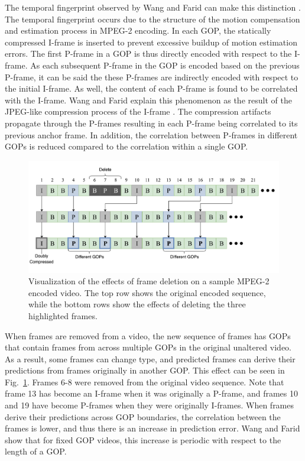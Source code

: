 The temporal fingerprint observed by Wang and Farid can make this distinction \cite{wang}. The temporal fingerprint occurs due to the structure of the motion compensation and estimation process in MPEG-2 encoding. In each GOP, the statically compressed I-frame is inserted to prevent excessive buildup of motion estimation errors. The first P-frame in a GOP is thus directly encoded with respect to the I-frame. As each subsequent P-frame in the GOP is encoded based on the previous P-frame, it can be said the these P-frames are indirectly encoded with respect to the initial I-frame. As well, the content of each P-frame is found to be correlated with the I-frame. Wang and Farid explain this phenomenon as the result of the JPEG-like compression process of the I-frame \cite{wang}. The compression artifacts propagate through the P-frames resulting in each P-frame being correlated to its previous anchor frame. In addition, the correlation between P-frames in different GOPs is reduced compared to the correlation within a single GOP.

\begin{figure}[htbp]
\centerline{\includegraphics[width=0.9\linewidth]{Background/frame_deletion.png}}
\caption[Visualization of the Effects of Frame Deletion on a Sample MPEG-2 Encoded Video.]{Visualization of the effects of frame deletion on a sample MPEG-2 encoded video. The top row shows the original encoded sequence, while the bottom rows show the effects of deleting the three highlighted frames.}
\label{framedeletion}
\end{figure}

When frames are removed from a video, the new sequence of frames has GOPs that contain frames from across multiple GOPs in the original unaltered video. As a result, some frames can change type, and predicted frames can derive their predictions from frames originally in another GOP. This effect can be seen in Fig.~\ref{framedeletion}. Frames 6-8 were removed from the original video sequence. Note that frame 13 has become an I-frame when it was originally a P-frame, and frames 10 and 19 have become P-frames when they were originally I-frames. When frames derive their predictions across GOP boundaries, the correlation between the frames is lower, and thus there is an increase in prediction error. Wang and Farid show that for fixed GOP videos, this increase is periodic with respect to the length of a GOP.

